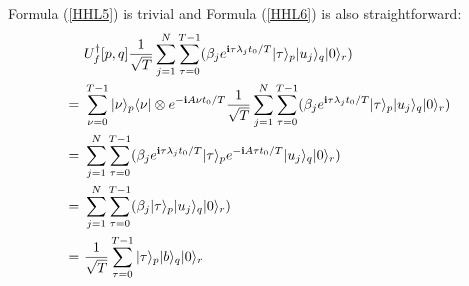 Formula (\ref{HHL5}) is trivial and Formula (\ref{HHL6}) is also straightforward:
\begin{align*}
&U_f^\dag[p,q]\frac{1}{\sqrt{T}}\sum_{j = 1}^N\sum_{\tau = 0}^{T-1}(\beta_je^{\mathbf{i} \tau\lambda_jt_0/T}|\tau\rangle_p|u_j\rangle_q|0\rangle_r) \\
=\ &\sum_{\nu = 0}^{T-1}|\nu\rangle_p\langle\nu|\otimes e^{-\mathbf{i} A\nu t_0/T}\frac{1}{\sqrt{T}}\sum_{j = 1}^N\sum_{\tau = 0}^{T-1}(\beta_je^{\mathbf{i} \tau\lambda_jt_0/T}|\tau\rangle_p|u_j\rangle_q|0\rangle_r) \\
=\ &\sum_{j = 1}^N\sum_{\tau = 0}^{T-1}(\beta_je^{\mathbf{i} \tau\lambda_jt_0/T}|\tau\rangle_pe^{-\mathbf{i} A\tau t_0/T}|u_j\rangle_q|0\rangle_r) \\
=\ &\sum_{j = 1}^N\sum_{\tau = 0}^{T-1}(\beta_j|\tau\rangle_p|u_j\rangle_q|0\rangle_r)\\
=\ &\frac{1}{\sqrt{T}}\sum_{\tau = 0}^{T-1}|\tau\rangle_p|b\rangle_q|0\rangle_r
\end{align*}

